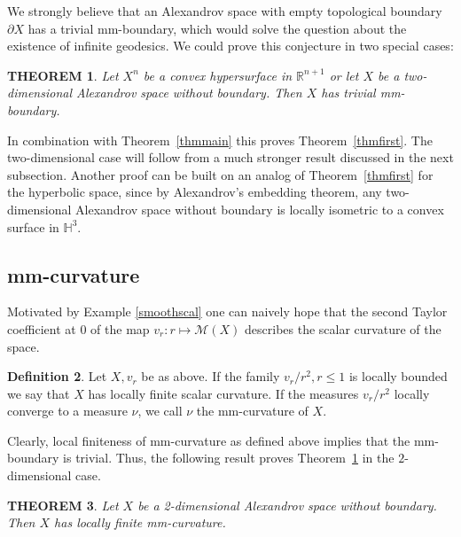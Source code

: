 \documentclass[12pt,leqno,intlimits]{amsart}
\numberwithin{equation}{section}
\newtheorem{thm}{THEOREM}[section]
\theoremstyle{definition}
\newtheorem{defn}[thm]{Definition}%
\theoremstyle{remark}
\newcommand{\tref}[1]{Theorem~\ref{#1}}
\newcommand{\R}{\mathbb{R}}
\begin{document}
 We strongly believe that an Alexandrov space with empty topological boundary $\partial X$  has a trivial mm-boundary,
which would solve the question about the existence of infinite geodesics.
We could prove this conjecture in two special cases:



\begin{thm} \label{hypersurface}
Let $X^n$ be a convex hypersurface in $\R^{n+1}$  or let $X$ be a two-dimensional  Alexandrov space without boundary. Then $X$ has trivial mm-boundary.
\end{thm}


In combination with \tref{thmmain} this proves \tref{thmfirst}.
The two-dimensional case
will follow from a much stronger result discussed in the next subsection.
Another proof can be built on an analog of \tref{thmfirst} for the hyperbolic space,
since by  Alexandrov's embedding theorem, any two-dimensional Alexandrov space without boundary
is locally isometric to a convex surface in $\mathbb H^3$.



\subsection{mm-curvature}
Motivated by Example \ref{smoothscal} one can naively hope that the second Taylor coefficient at $0$ of the
map $v_r\colon r\mapsto \mathcal M(X)$ describes the scalar curvature of the space.



\begin{defn}
Let $X,v_r$ be as above. 
If the family $v_r /r^2, r\leq 1$ is locally bounded we say that $X$ has locally finite  scalar curvature.
If the measures $v_r /r^2$ locally converge to a measure $\nu$, we call $\nu$ the mm-curvature of $X$.
\end{defn}


Clearly, local finiteness of mm-curvature as defined above implies that the mm-boundary is trivial.
Thus, the following result proves \tref{hypersurface} in the $2$-dimensional case.


\begin{thm} \label{intsurface}
 Let $X$ be a 2-dimensional Alexandrov space without boundary.
 Then $X$ has locally finite mm-curvature.
\end{thm}
\end{document}
